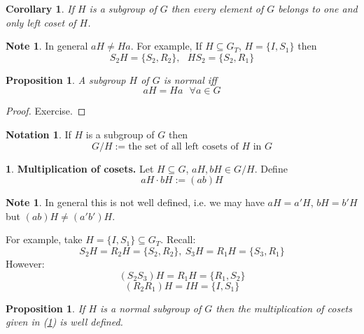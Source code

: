 \documentclass[12pt, letterpaper, oneside]{article}
\theoremstyle{plain}
\newtheorem{proposition}[theorem]{Proposition}
\newtheorem{corollary}[theorem]{Corollary}
\theoremstyle{definition}
\newtheorem{notation}[theorem]{Notation}
\newtheorem{note}[theorem]{Note}
\newtheorem{nn}[theorem]{}
\newcommand{\vs}{\vskip 5mm}
\begin{document}
\vs

\begin{corollary}
\label{COR_DISJCOSETS}
If $H$ is a subgroup of $G$ then every element of $G$ belongs to one and only left 
coset of $H$.
\end{corollary}


\vs



\begin{note}
In general $aH\neq Ha$. For example, If $H\subseteq G_{T}$, 
$H= \{I, S_{1}\}$ then 
$$S_{2}H = \{S_{2}, R_{2}\}, \ \ \ HS_{2} = \{S_{2}, R_{1}\}$$ 

\end{note}



\vs


\begin{proposition}
\label{PROP_LRCOSETS}
A subgroup $H$ of $G$ is normal iff 
$$aH = Ha \ \ \ \forall a\in G$$
\end{proposition}


\begin{proof}
Exercise.
\end{proof}


\vs

\begin{notation}
If $H$ is a subgroup of $G$ then 
$$G/H := \text{the set of all left cosets of } H \text{ in } G$$ 
\end{notation}

\vs

\begin{nn}\textbf{Multiplication of cosets. }
\label{NN_COSETMULT}
Let $H\subseteq G$, $aH, bH \in G/H$. Define
$$aH \cdot bH := (ab)H$$
\end{nn}

\vs

\begin{note}
In general this is not well defined, i.e. we may have $aH = a'H$, $bH= b'H$ but 
$(ab)H \neq (a'b')H$. 

For example,  take $H=\{ I, S_{1}\}\subseteq G_{T}$. Recall:
$$S_{2}H = R_{2}H = \{S_{2}, R_{2}\}, \ S_{3}H = R_{1}H = \{S_{3}, R_{1}\}$$
However:
$$(S_{2}S_{3})H = R_{1}H = \{R_{1}, S_{2}\}$$
$$(R_{2}R_{1})H = IH = \{I, S_{1}\}$$

\end{note}

\vs

\begin{proposition}
If $H$ is a normal subgroup of $G$ then the multiplication of cosets given in (\ref{NN_COSETMULT})
is well defined.
\end{proposition}
\end{document}
